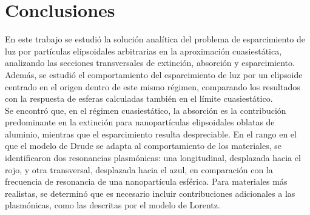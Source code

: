 \hypertarget{conclusiones}{\section{Conclusiones}}

En este trabajo se estudió la solución analítica del problema de esparcimiento de luz por partículas elipsoidales arbitrarias en la aproximación cuasiestática, analizando las secciones transversales de extinción, absorción y esparcimiento. Además, se estudió el comportamiento del esparcimiento de luz por un elipsoide centrado en el origen dentro de este mismo régimen, comparando los resultados con la respuesta de esferas calculadas también en el límite cuasiestático.\\

Se encontró que, en el régimen cuasiestático, la absorción es la contribución predominante en la extinción para nanopartículas elipsoidales oblatas de aluminio, mientras que el esparcimiento resulta despreciable. En el rango en el que el modelo de Drude se adapta al comportamiento de los materiales, se identificaron dos resonancias plasmónicas: una longitudinal, desplazada hacia el rojo, y otra transversal, desplazada hacia el azul, en comparación con la frecuencia de resonancia de una nanopartícula esférica. Para materiales más realistas, se determinó que es necesario incluir contribuciones adicionales a las plasmónicas, como las descritas por el modelo de Lorentz.

